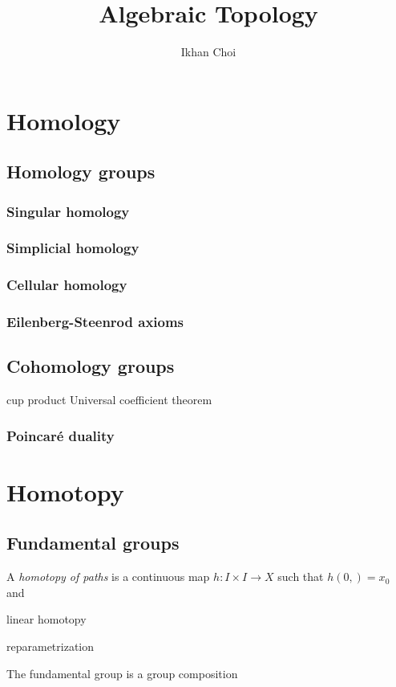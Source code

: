 \documentclass{../../large}
\begin{document}
\title{Algebraic Topology}
\author{Ikhan Choi}
\maketitle
\tableofcontents


\part{Homology}

\chapter{Homology groups}
\section{Singular homology}
\section{Simplicial homology}
\section{Cellular homology}
\section{Eilenberg-Steenrod axioms}

\chapter{Cohomology groups}

cup product
Universal coefficient theorem

\section{Poincar\'e duality}

\chapter{}



\part{Homotopy}
\chapter{Fundamental groups}
\begin{prb}
A \emph{homotopy of paths} is a continuous map $h:I\times I\to X$ such that $h(0,)=x_0$ and 
\begin{parts}
\item linear homotopy
\item reparametrization
\end{parts}
\end{prb}
\begin{prb}
The fundamental group is a group
composition
\end{prb}
\end{document}
